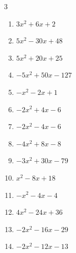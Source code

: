 \begin{multicols}{3}
\begin{enumerate}
  \item $3x^{2}+6x+2$


  \item $5x^{2}-30x+48$


  \item $5x^{2}+20x+25$


  \item $-5x^{2}+50x-127$


  \item $-x^{2}-2x+1$


  \item $-2x^{2}+4x-6$


\columnbreak %

  \item $-2x^{2}-4x-6$


  \item $-4x^{2}+8x-8$


  \item $-3x^{2}+30x-79$


  \item $x^{2}-8x+18$


  \item $-x^{2}-4x-4$


  \item $4x^{2}-24x+36$


  \item $-2x^{2}-16x-29$


  \item $-2x^{2}-12x-13$


\end{enumerate}
\end{multicols}
